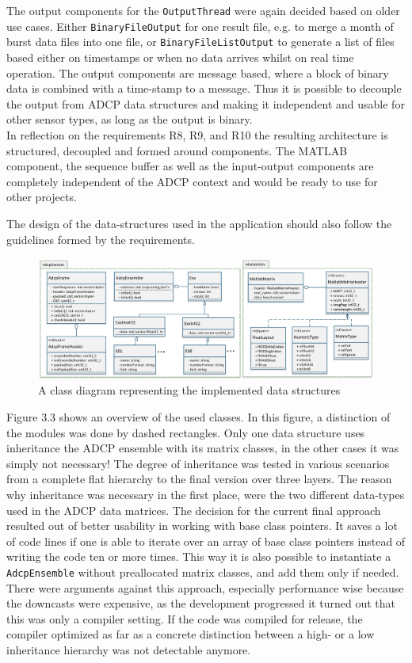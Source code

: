The output components for the \texttt{OutputThread} were again decided based on older use cases. Either \texttt{BinaryFileOutput} for one result file, e.g. to merge a month of burst data files into one file, or \texttt{BinaryFileListOutput} to generate a list of files based either on timestamps or when no data arrives whilst on real time operation. The output components are message based, where a block of binary data is combined with a time-stamp to a message. Thus it is possible to decouple the output from ADCP data structures and making it independent and usable for other sensor types, as long as the output is binary.\\
 

In reflection on the requirements R8, R9, and R10 the resulting architecture is structured, decoupled and formed around components. The MATLAB component, the sequence buffer as well as the input-output components are completely independent of the ADCP context and would be ready to use for other projects.

The design of the data-structures used in the application should also follow the guidelines formed by the requirements. 
\begin{figure}[h]
\centering
      \includegraphics[width=1\textwidth]{data_structures}
        \caption{A class diagram representing the implemented data structures}
\end{figure}
Figure 3.3 shows an overview of the used classes. In this figure, a distinction of the modules was done by dashed rectangles. Only one data structure uses inheritance the ADCP ensemble with its matrix classes, in the other cases it was simply not necessary! The degree of inheritance was tested in various scenarios from a complete flat hierarchy to the final version over three layers. The reason why inheritance was necessary in the first place, were the two different data-types used in the ADCP data matrices. The decision for the current final approach resulted out of better usability in working with base class pointers. It saves a lot of code lines if one is able to iterate over an array of base class pointers instead of writing the code ten or more times. This way it is also possible to instantiate a \texttt{AdcpEnsemble} without preallocated matrix classes, and add them only if needed. There were arguments against this approach, especially performance wise because the downcasts were expensive, as the development progressed it turned out that this was only a compiler setting. If the code was compiled for release, the compiler optimized as far as a concrete distinction between a high- or a low inheritance hierarchy was not detectable anymore.

